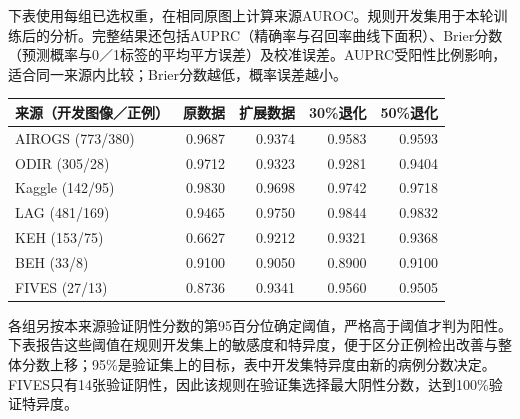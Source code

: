 \documentclass[
  10pt,
]{article}
\begin{document}
下表使用每组已选权重，在相同原图上计算来源AUROC。规则开发集用于本轮训练后的分析。完整结果还包括AUPRC（精确率与召回率曲线下面积）、Brier分数（预测概率与0／1标签的平均平方误差）及校准误差。AUPRC受阳性比例影响，适合同一来源内比较；Brier分数越低，概率误差越小。

\begin{longtable}[]{@{}lrrrr@{}}
\toprule\noalign{}
来源（开发图像／正例） & 原数据 & 扩展数据 & 30\%退化 & 50\%退化 \\
\midrule\noalign{}
\endhead
\bottomrule\noalign{}
\endlastfoot
AIROGS (773/380) & 0.9687 & 0.9374 & 0.9583 & 0.9593 \\
ODIR (305/28) & 0.9712 & 0.9323 & 0.9281 & 0.9404 \\
Kaggle (142/95) & 0.9830 & 0.9698 & 0.9742 & 0.9718 \\
LAG (481/169) & 0.9465 & 0.9750 & 0.9844 & 0.9832 \\
KEH (153/75) & 0.6627 & 0.9212 & 0.9321 & 0.9368 \\
BEH (33/8) & 0.9100 & 0.9050 & 0.8900 & 0.9100 \\
FIVES (27/13) & 0.8736 & 0.9341 & 0.9560 & 0.9505 \\
\end{longtable}

各组另按本来源验证阴性分数的第95百分位确定阈值，严格高于阈值才判为阳性。下表报告这些阈值在规则开发集上的敏感度和特异度，便于区分正例检出改善与整体分数上移；95\%是验证集上的目标，表中开发集特异度由新的病例分数决定。FIVES只有14张验证阴性，因此该规则在验证集选择最大阴性分数，达到100\%验证特异度。
\end{document}
